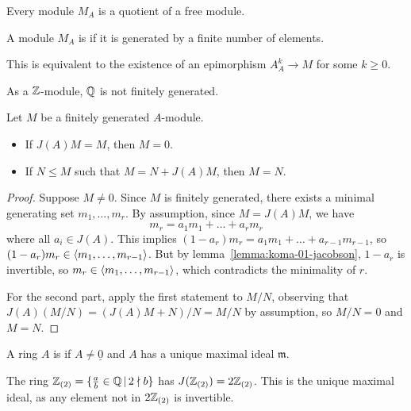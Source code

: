 \begin{remark}
  Every module $M_A$ is a quotient of a free module.
\end{remark}

\begin{definition}
  A module $M_A$ is  if it is generated by a finite
  number of elements.
\end{definition}

\begin{remark}
  This is equivalent to the existence of an epimorphism $A_A^k \to M$ for some
  $k \ge 0$.
\end{remark}

\begin{example}
  As a $\mathbb{Z}$-module, $\mathbb{Q}$ is not finitely generated.
\end{example}

\begin{lemma}[Nakayama]
  Let $M$ be a finitely generated $A$-module.
  \begin{itemize}
  \item If $J(A) M = M$, then $M = 0$.
  \item If $N \le M$ such that $M = N + J(A) M$, then $M = N$.
  \end{itemize}
\end{lemma}

\begin{proof}
  Suppose $M \ne 0$.
  Since $M$ is finitely generated, there exists a minimal generating set $m_1,
  \ldots, m_r$.
  By assumption, since $M = J(A) M$, we have
  \[
	m_r = a_1 m_1 + \ldots + a_r m_r
  \]
  where all $a_i \in J(A)$.
  This implies $(1 - a_r) m_r = a_1 m_1 + \ldots + a_{r-1} m_{r-1}$, so $(1 -
  a_r) m_r \in \left< m_1, \ldots, m_{r-1} \right>$.
  But by lemma~\ref{lemma:koma-01-jacobson}, $1 - a_r$ is invertible, so $m_r
  \in \left< m_1, \ldots, m_{r-1} \right>$, which contradicts the minimality of $r$.

  For the second part, apply the first statement to $M/N$, observing that $J(A)
  (M/N) = (J(A)M + N)/N = M/N$ by assumption, so $M/N = 0$ and $M = N$.
\end{proof}

\begin{definition}
  A ring $A$ is  if $A \ne \underline{0}$ and $A$ has a unique
  maximal ideal $\mathfrak{m}$.
\end{definition}

\begin{example}
  The ring $\mathbb{Z}_{(2)} = \{ \frac{a}{b} \in \mathbb{Q} \,|\, 2 \nmid b \}$ has
  $J(\mathbb{Z}_{(2)}) = 2 \mathbb{Z}_{(2)}$.
  This is the unique maximal ideal, as any element not in $2 \mathbb{Z}_{(2)}$ is
  invertible.
\end{example}

